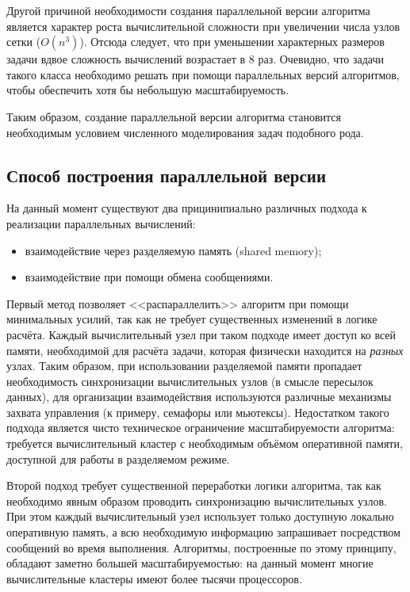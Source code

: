 Другой причиной необходимости создания параллельной версии алгоритма является характер роста вычислительной сложности при увеличении числа узлов сетки ($O(n^3)$). Отсюда следует, что при уменьшении характерных размеров задачи вдвое сложность вычислений возрастает в 8 раз. Очевидно, что задачи такого класса необходимо решать при помощи параллельных версий алгоритмов, чтобы обеспечить хотя бы небольшую масштабируемость.

Таким образом, создание параллельной версии алгоритма становится необходимым условием численного моделирования задач подобного рода.

\subsection{Способ построения параллельной версии}
На данный момент существуют два прицинипиально различных подхода к реализации параллельных вычислений:
\begin{itemize}
\item взаимодействие через разделяемую память (shared memory);
\item взаимодействие при помощи обмена сообщениями.
 \end{itemize}

Первый метод позволяет <<распараллелить>> алгоритм при помощи минимальных
усилий, так как не требует существенных изменений в логике расчёта. Каждый
вычислительный узел при таком подходе имеет доступ ко всей памяти, необходимой
для расчёта задачи, которая физически находится на \emph{разных} узлах. Таким
образом, при использовании разделяемой памяти пропадает необходимость
синхронизации вычислительных узлов (в смысле пересылок данных), для организации
взаимодействия используются различные механизмы захвата управления (к примеру,
семафоры или мьютексы). Недостатком такого подхода является чисто техническое
ограничение масштабируемости алгоритма: требуется вычислительный кластер с
необходимым объёмом оперативной памяти, доступной для работы в разделяемом
режиме.

Второй подход требует существенной переработки логики алгоритма, так как необходимо явным образом проводить синхронизацию вычислительных узлов. При этом каждый вычислительный узел использует только доступную локально оперативную память, а всю необходимую информацию запрашивает посредством сообщений во время выполнения. Алгоритмы, построенные по этому принципу, обладают заметно большей масштабируемостью: на данный момент многие вычислительные кластеры имеют более тысячи процессоров.

